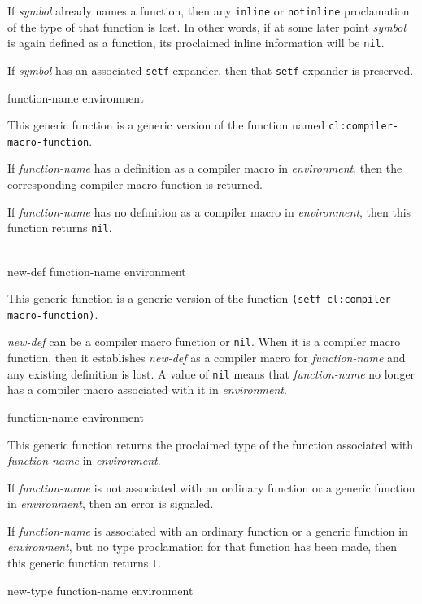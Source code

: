 If \textit{symbol} already names a function, then any \texttt{inline} or
\texttt{notinline} proclamation of the type of that function is lost.  In other
words, if at some later point \textit{symbol} is again defined as a
function, its proclaimed inline information will be \texttt{nil}.

If \textit{symbol} has an associated \texttt{setf} expander, then that
\texttt{setf} expander is preserved.

 {function-name environment}

This generic function is a generic version of the \commonlisp{}
function named \texttt{cl:compiler-macro-function}.

If \textit{function-name} has a definition as a compiler macro in
\textit{environment}, then the corresponding compiler macro function
is returned.

If \textit{function-name} has no definition as a compiler macro in
\textit{environment}, then this function returns \texttt{nil}.

\\
{new-def function-name environment}

This generic function is a generic version of the \commonlisp{}
function \texttt{(setf cl:compiler-macro-function)}.

\textit{new-def} can be a compiler macro function or \texttt{nil}.
When it is a compiler macro function, then it establishes
\textit{new-def} as a compiler macro for \textit{function-name} and
any existing definition is lost.  A value of \texttt{nil} means that
\textit{function-name} no longer has a compiler macro associated with
it in \textit{environment}.

 {function-name environment}

This generic function returns the proclaimed type of the function
associated with \textit{function-name} in \textit{environment}.

If \textit{function-name} is not associated with an ordinary function
or a generic function in \textit{environment}, then an error is
signaled.

If \textit{function-name} is associated with an ordinary function or a
generic function in \textit{environment}, but no type proclamation for
that function has been made, then this generic function returns
\texttt{t}.

 {new-type function-name environment}

